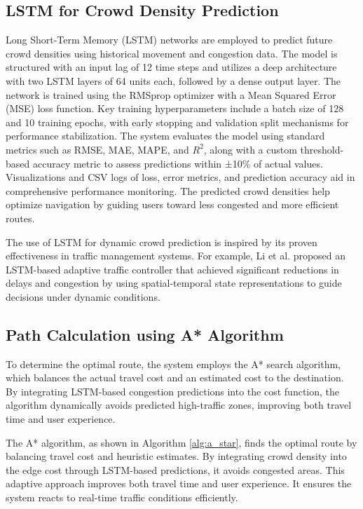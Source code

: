 \subsection{LSTM for Crowd Density Prediction}
Long Short-Term Memory (LSTM) networks are employed to predict future crowd densities using historical movement and congestion data. The model is structured with an input lag of 12 time steps and utilizes a deep architecture with two LSTM layers of 64 units each, followed by a dense output layer. The network is trained using the RMSprop optimizer with a Mean Squared Error (MSE) loss function. Key training hyperparameters include a batch size of 128 and 10 training epochs, with early stopping and validation split mechanisms for performance stabilization. The system evaluates the model using standard metrics such as RMSE, MAE, MAPE, and $R^2$, along with a custom threshold-based accuracy metric to assess predictions within ±10\% of actual values. Visualizations and CSV logs of loss, error metrics, and prediction accuracy aid in comprehensive performance monitoring. The predicted crowd densities help optimize navigation by guiding users toward less congested and more efficient routes.

The use of LSTM for dynamic crowd prediction is inspired by its proven effectiveness in traffic management systems. For example, Li et al. \cite{li2020deep} proposed an LSTM-based adaptive traffic controller that achieved significant reductions in delays and congestion by using spatial-temporal state representations to guide decisions under dynamic conditions.


\subsection{Path Calculation using A* Algorithm}

To determine the optimal route, the system employs the A* search algorithm, which balances the actual travel cost and an estimated cost to the destination. By integrating LSTM-based congestion predictions into the cost function, the algorithm dynamically avoids predicted high-traffic zones, improving both travel time and user experience.


The A* algorithm, as shown in Algorithm \ref{alg:a_star}, finds the optimal route by balancing travel cost and heuristic estimates. By integrating crowd density into the edge cost through LSTM-based predictions, it avoids congested areas. This adaptive approach improves both travel time and user experience. It ensures the system reacts to real-time traffic conditions efficiently.

